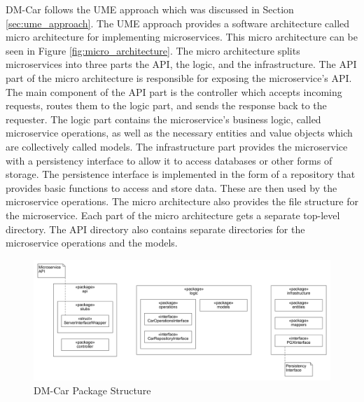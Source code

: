DM-Car follows the UME approach which was discussed in Section
\ref{sec:ume_approach}. The UME approach provides a software architecture
called micro architecture for implementing microservices. This micro
architecture can be seen in Figure \ref{fig:micro_architecture}. The micro
architecture splits microservices into three parts the API, the logic, and the
infrastructure. The API part of the micro architecture is responsible for
exposing the microservice's API. The main component of the API part is the
controller which accepts incoming requests, routes them to the logic part, and
sends the response back to the requester. The logic part contains the
microservice's business logic, called microservice operations, as well as the
necessary entities and value objects which are collectively called models. The
infrastructure part provides the microservice with a persistency interface to
allow it to access databases or other forms of storage. The persistence
interface is implemented in the form of a repository that provides basic
functions to access and store data. These are then used by the microservice
operations. The micro architecture also provides the file structure for the
microservice. Each part of the micro architecture gets a separate top-level
directory. The API directory also contains separate directories for the
microservice operations and the models.

\begin{figure}[h]
	\centering
	\includegraphics[width=\textwidth]{figures/dm_car_package_structure.png}
	\caption{DM-Car Package Structure}
	\label{fig:dm_car_package_structure}
\end{figure}

